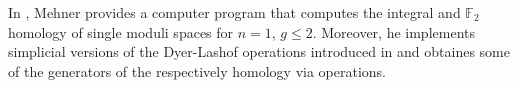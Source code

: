 In \cite{Mehner201112}, Mehner provides a computer program that computes the integral and $\mathbb F_2$ homology of single moduli spaces for $n=1$, $g \le 2$.
Moreover, he implements simplicial versions of the Dyer-Lashof operations introduced in \cite{Boedigheimer19902} and obtaines some of the generators of the respectively homology via operations.
